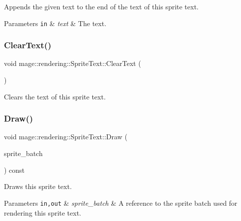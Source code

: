 Appends the given text to the end of the text of this sprite text.


\begin{DoxyParams}[1]{Parameters}
\mbox{\tt in}  & {\em text} & The text. \\
\hline
\end{DoxyParams}
\mbox{\label{classmage_1_1rendering_1_1_sprite_text_a4458a9a429369d6cc0ed34eb93f3e632}} 
\subsubsection{\texorpdfstring{Clear\+Text()}{ClearText()}}
{\footnotesize\ttfamily void mage\+::rendering\+::\+Sprite\+Text\+::\+Clear\+Text (\begin{DoxyParamCaption}{ }\end{DoxyParamCaption})\hspace{0.3cm}{\ttfamily [noexcept]}}

Clears the text of this sprite text. \mbox{\label{classmage_1_1rendering_1_1_sprite_text_afbe374756e97dcec4fcf83f76a0c233b}} 
\subsubsection{\texorpdfstring{Draw()}{Draw()}}
{\footnotesize\ttfamily void mage\+::rendering\+::\+Sprite\+Text\+::\+Draw (\begin{DoxyParamCaption}\item[{\mbox{\hyperlink{classmage_1_1rendering_1_1_sprite_batch}{Sprite\+Batch}} \&}]{sprite\+\_\+batch }\end{DoxyParamCaption}) const}

Draws this sprite text.


\begin{DoxyParams}[1]{Parameters}
\mbox{\tt in,out}  & {\em sprite\+\_\+batch} & A reference to the sprite batch used for rendering this sprite text. \\
\hline
\end{DoxyParams}
\mbox{\label{classmage_1_1rendering_1_1_sprite_text_a09b0f98a4be62a6b271f4adfce01ea07}} 
